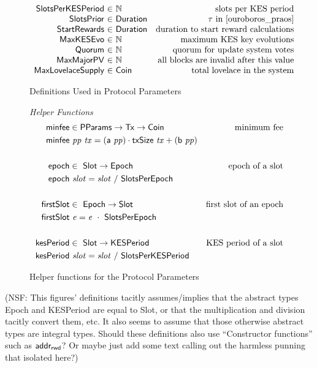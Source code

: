 \begin{figure*}[htb]
\begin{equation*}
\begin{array}{r@{~\in~}lr}
      \SlotsPerKESPeriod & \N & \text{slots per KES period} \\
      \SlotsPrior & \Duration & \tau\text{ in \cite{ouroboros_praos}}\\
      \StartRewards & \Duration & \text{duration to start reward calculations}\\
      \MaxKESEvo & \N & \text{maximum KES key evolutions}\\
      \Quorum & \N & \text{quorum for update system votes}\\
      \MaxMajorPV & \N & \text{all blocks are invalid after this value}\\
      \MaxLovelaceSupply & \Coin & \text{total lovelace in the system}\\
    \end{array}
  \end{equation*}
  \caption{Definitions Used in Protocol Parameters}
  \label{fig:defs:protocol-parameters}
\end{figure*}

\begin{figure*}[htb]
  \emph{Helper Functions}
  \begin{align*}
    \mathsf{minfee} & \in \mathsf{PParams} \to \mathsf{Tx} \to \mathsf{Coin} & \text{minimum fee}\\
    \mathsf{minfee} & ~\mathit{pp}~\mathit{tx} =
    (\mathsf{a}~\mathit{pp}) \cdot \mathsf{txSize}~\mathit{tx} + (\mathsf{b}~\mathit{pp})
    \\
    \\
    \mathsf{epoch} & \in ~ \mathsf{Slot} \to \mathsf{Epoch} & \text{epoch of a slot}
    \\
    \mathsf{epoch} & ~\mathit{slot} = \mathit{slot}~/~\mathsf{SlotsPerEpoch}
    \\
    \\
    \mathsf{firstSlot} & \in ~ \mathsf{Epoch} \to \mathsf{Slot}
               & \text{first slot of an epoch}
    \\
    \mathsf{firstSlot} & ~\mathit{e} = \mathit{e}~\cdot~\mathsf{SlotsPerEpoch}
    \\
    \\
    \mathsf{kesPeriod} & \in ~ \mathsf{Slot} \to \mathsf{KESPeriod} & \text{KES period of a slot}
    \\
    \mathsf{kesPeriod} & ~\mathit{slot} = \mathit{slot}~/~\mathsf{SlotsPerKESPeriod}
  \end{align*}
  \caption{Helper functions for the Protocol Parameters}
  \label{fig:defs:protocol-parameters-helpers}
\end{figure*}

(NSF: This figures' definitions tacitly assumes/implies that the abstract types
Epoch and KESPeriod are equal to Slot, or that the multiplication and division
tacitly convert them, etc. It also seems to assume that those otherwise
abstract types are integral types. Should these definitions also use
``Constructor functions'' such as $\mathsf{addr_{rwd}}$? Or maybe just add some
text calling out the harmless punning that isolated here?)

\clearpage

